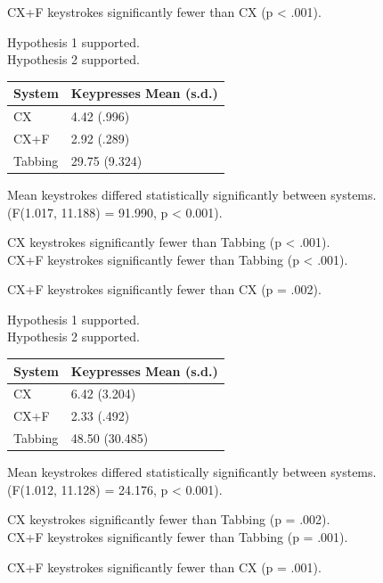 \documentclass[11pt,openright,a4paper]{report}
\begin{document}
CX+F keystrokes significantly fewer than CX (p < .001).

Hypothesis 1 supported.\\
Hypothesis 2 supported.

\begin{tabular}{l l}
\hline\hline %
System & Keypresses Mean (s.d.) \\ [0.5ex] %
\hline %
CX & 4.42 (.996)\\
CX+F & 2.92 (.289)\\
Tabbing & 29.75 (9.324)\\ [1ex] %
\hline %
\end{tabular}

Mean keystrokes differed statistically significantly between systems.\\
(F(1.017, 11.188) = 91.990, p < 0.001).

CX keystrokes significantly fewer than Tabbing (p < .001).\\
CX+F keystrokes significantly fewer than Tabbing (p < .001).

CX+F keystrokes significantly fewer than CX (p = .002).

Hypothesis 1 supported.\\
Hypothesis 2 supported.

\begin{tabular}{l l}
\hline\hline %
System & Keypresses Mean (s.d.) \\ [0.5ex] %
\hline %
CX & 6.42 (3.204)\\
CX+F & 2.33 (.492)\\
Tabbing & 48.50 (30.485)\\ [1ex] %
\hline %
\end{tabular}

Mean keystrokes differed statistically significantly between systems.\\
(F(1.012, 11.128) = 24.176, p < 0.001).

CX keystrokes significantly fewer than Tabbing (p = .002).\\
CX+F keystrokes significantly fewer than Tabbing (p = .001).

CX+F keystrokes significantly fewer than CX (p = .001).
\end{document}
